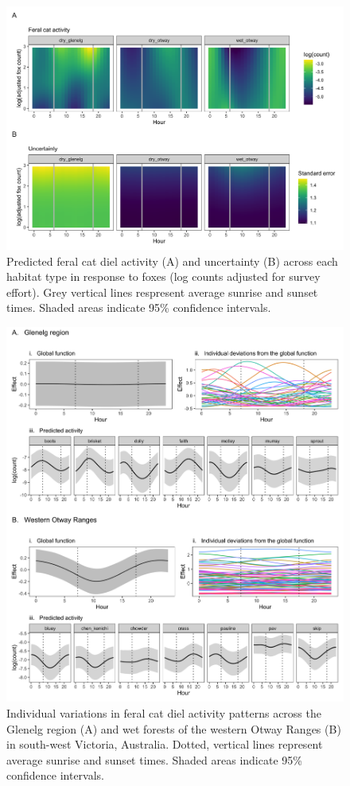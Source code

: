 \documentclass[]{elsarticle} %
\begin{document}
\newpage

\begin{figure}
\includegraphics[width=1\linewidth]{../figs/cat_fox_count} \caption{Predicted feral cat diel activity (A) and uncertainty (B) across each habitat type in response to foxes (log counts adjusted for survey effort). Grey vertical lines respresent average sunrise and sunset times. Shaded areas indicate 95\% confidence intervals.}\label{fig:count}
\end{figure}

\newpage

\begin{figure}
\includegraphics[width=1\linewidth]{../figs/cat_ind} \caption{Individual variations in feral cat diel activity patterns across the Glenelg region (A) and wet forests of the western Otway Ranges (B) in south-west Victoria, Australia. Dotted, vertical lines represent average sunrise and sunset times. Shaded areas indicate 95\% confidence intervals.}\label{fig:ind}
\end{figure}
\end{document}
